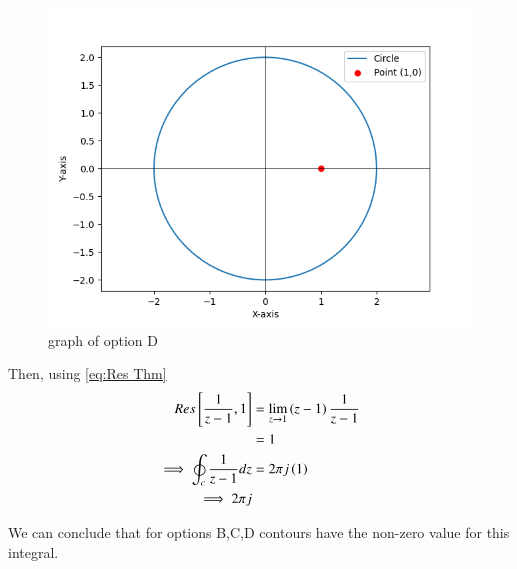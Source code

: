 \documentclass[journal,12pt,twocolumn]{IEEEtran}
\theoremstyle{remark}
\begin{document}
\begin{enumerate}
\begin{figure}[h!]
    \includegraphics[width=1\columnwidth]{2023/BM/48/figs/plotg234.png}
    \caption{graph of option D}
\end{figure}
Then, using \eqref{eq:Res Thm}
\begin{align}
Res{}\left[\frac{1}{z-1},1\right] &=\lim_{z\to 1}\left(z-1\right)\frac{1}{z-1}\\
&=1\\
\implies \oint_{c}\frac{1}{z-1}dz&=2\pi j\left(1\right)\\
\implies 2\pi j
\end{align}
\end{enumerate}
We can conclude that for options B,C,D contours have the non-zero value for this integral.
\end{document}
